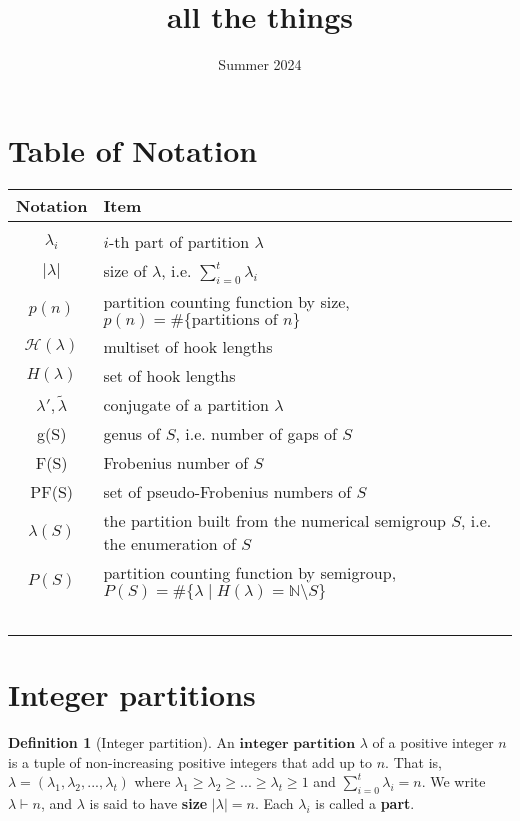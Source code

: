 \documentclass{article}
\title{all the things}
\date{Summer 2024}
\theoremstyle{definition}
\theoremstyle{definition}
\newtheorem{defn}[thm]{Definition}
\theoremstyle{definition}
\begin{document}
\section{Table of Notation}
\begin{table}[!h]
    \centering
    \begin{tabularx}{\textwidth}{c|X}
        Notation & Item \\
        \hline \\
        $\lambda_i$ & $i$-th part of partition $\lambda$ \\
        $|\lambda|$ & size of $\lambda$, i.e. $\sum\limits_{i=0}^t\lambda_i$ \\
        $p(n)$ & partition counting function by size, $p(n) =  \#\{\text{partitions of }n\}$\\
         $\mathcal{H}(\lambda)$ & multiset of hook lengths \\
         $H(\lambda)$ & set of hook lengths \\
         $\lambda ', \tilde{\lambda}$ & conjugate of a partition $\lambda$ \\
         g(S) & genus of $S$, i.e. number of gaps of $S$ \\
         F(S) & Frobenius number of $S$ \\
         PF(S) & set of pseudo-Frobenius numbers of $S$ \\
         $\lambda(S)$ & the partition built from the numerical semigroup $S$, \newline i.e. the enumeration of $S$ \\
         $P(S)$ & partition counting function by semigroup, \newline $P(S) = \#\{\lambda \mid H(\lambda) = \mathbb{N} \setminus S\}$ \\
         & \\
         & \\
         & \\
         & \\
         & \\
    \end{tabularx}
\end{table}
\section{Integer partitions}
\begin{defn}[Integer partition]
    An $\textbf{integer partition}$ $\lambda$ of a positive integer $n$ is a tuple of non-increasing positive integers that add up to $n$. That is, $\lambda = (\lambda_1, \lambda_2, ..., \lambda_t)$ where $\lambda_1 \geq \lambda_2 \geq ... \geq \lambda_t \geq 1$ and $\sum\limits_{i=0}^t\lambda_i = n$. We write $\lambda \vdash n$, and $\lambda$ is said to have \textbf{size} $\mid\lambda\mid = n$. Each $\lambda_i$ is called a \textbf{part}.
\end{defn}
\end{document}
